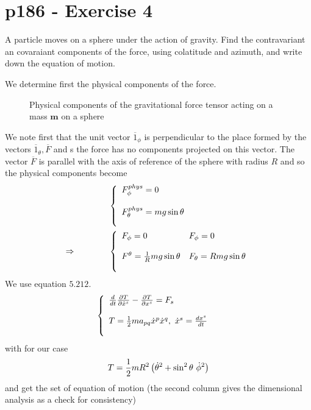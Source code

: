 \section{p186 - Exercise 4}
\begin{tcolorbox}
A particle moves on a sphere under the action of gravity. Find the contravariant an covaraiant components of the force, using colatitude and azimuth, and write down the equation of motion.
\end{tcolorbox}
We determine first the physical components of the force.
\begin{figure}[H]

\caption{Physical components of the gravitational force tensor acting on a mass $\mathbf{m}$ on a sphere }
\label{fig:fig_p186_Ex2}
\end{figure}
We note first that the unit vector $\overline{1}_{\phi}$ is perpendicular to the place formed by the vectors  $\overline{1}_{\theta},\overline{F}$ and s the force has no components projected on this vector. The vector $\overline{F}$ is parallel with the axis of reference of the sphere with radius $R$ and so the physical components become
\begin{align}
&\left\{\begin{array}{l}
F_{\phi}^{phys}= 0\\\\
F_{\theta}^{phys}= mg\sin{\theta}\\\\
\end{array}\right.\\
\Rightarrow\quad\quad\quad\quad &\left\{\begin{array}{ll}
F_{\phi}= 0&F_{\phi}= 0\\\\
F^{\theta}= \frac{1}{R}mg\sin{\theta}&F_{\theta}= R m g\sin{\theta}\\\\
\end{array}\right.
\end{align}
We use equation $\mathbf{5.212.}$
\begin{align}
&\left\{\begin{array}{l}
\dv{}{t}\frac{\partial T}{\partial \dot{x}^s} - \frac{\partial T}{\partial x^s} = F_{s}\\\\
T = \frac{1}{2} m a_{pq}\dot{x}^p\dot{x}^q, \ \dot{x}^s=\dv{x^s}{t}\\\\
\end{array}\right.
\end{align}
with for our case
\begin{align}
T = \frac{1}{2} m R^2\left(\dot{\theta}^2+ \sin^2 \theta \ \dot{\phi}^2 \right)
\end{align}
and get the set of equation of motion (the second column gives the dimensional analysis as a check for consistency)

